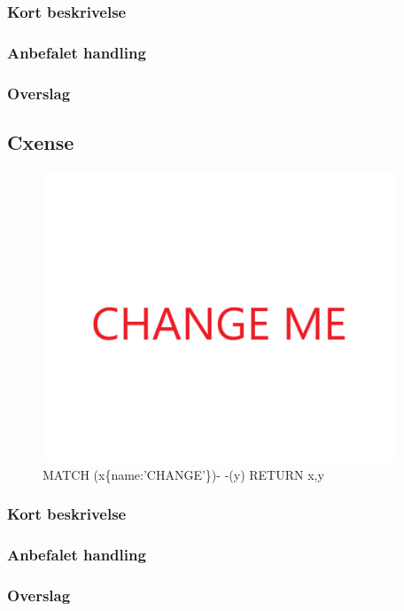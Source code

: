 \documentclass{article}
\begin{document}
\subsubsection{Kort beskrivelse}
\subsubsection{Anbefalet handling}
\subsubsection{Overslag}
\subsection{Cxense}
\begin{figure}[h]
\includegraphics[width=300pt]{CHANGE.PNG}
\caption{MATCH (x\{name:'CHANGE'\})- -(y) RETURN x,y}
\end{figure}
\subsubsection{Kort beskrivelse}
\subsubsection{Anbefalet handling}
\subsubsection{Overslag}
\end{document}
